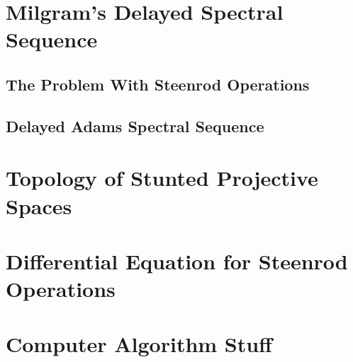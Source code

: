 \section{Milgram's Delayed Spectral Sequence}

\subsection{The Problem With Steenrod Operations}

\subsection{Delayed Adams Spectral Sequence}

\section{Topology of Stunted Projective Spaces}

\section{Differential Equation for Steenrod Operations}

\section{Computer Algorithm Stuff}
